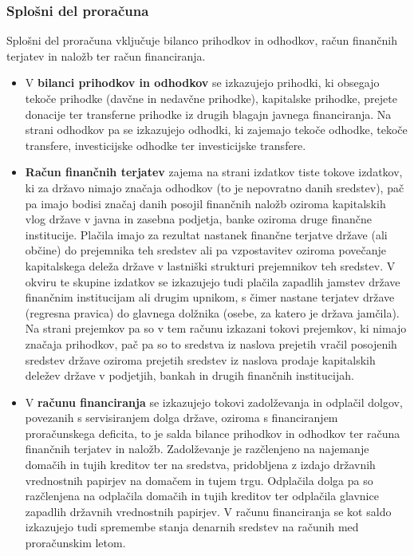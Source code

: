 \documentclass[12pt, a4paper]{article}
\begin{document}
\subsubsection[Splošno del proračuna]{Splošni del proračuna}
Splošni del proračuna vključuje bilanco prihodkov in odhodkov, račun finančnih terjatev in naložb ter račun financiranja.
\begin{itemize}
\item V \textbf{bilanci prihodkov in odhodkov} se izkazujejo prihodki, ki obsegajo tekoče prihodke (davčne in nedavčne prihodke), kapitalske prihodke, prejete donacije ter transferne prihodke iz drugih blagajn javnega financiranja. Na strani odhodkov pa se izkazujejo odhodki, ki zajemajo tekoče odhodke, tekoče transfere, investicijske odhodke ter investicijske transfere.

\item \textbf{Račun finančnih terjatev} zajema na strani izdatkov tiste tokove izdatkov, ki za državo nimajo značaja odhodkov (to je nepovratno danih sredstev), pač pa imajo bodisi značaj danih posojil finančnih naložb oziroma kapitalskih vlog države v javna in zasebna podjetja, banke oziroma druge finančne institucije. Plačila imajo za rezultat nastanek finančne terjatve države (ali občine) do prejemnika teh sredstev ali pa vzpostavitev oziroma povečanje kapitalskega deleža države v lastniški strukturi prejemnikov teh sredstev. V okviru te skupine izdatkov se izkazujejo tudi plačila zapadlih jamstev države finančnim institucijam ali drugim upnikom, s čimer nastane terjatev države (regresna pravica) do glavnega dolžnika (osebe, za katero je država jamčila). Na strani prejemkov pa so v tem računu izkazani tokovi prejemkov, ki nimajo značaja prihodkov, pač pa so to sredstva iz naslova prejetih vračil posojenih sredstev države oziroma prejetih sredstev iz naslova prodaje kapitalskih deležev države v podjetjih, bankah in drugih finančnih institucijah.

\item V \textbf{računu financiranja} se izkazujejo tokovi zadolževanja in odplačil dolgov, povezanih s servisiranjem dolga države, oziroma s financiranjem proračunskega deficita, to je salda bilance prihodkov in odhodkov ter računa finančnih terjatev in naložb. Zadolževanje je razčlenjeno na najemanje domačih in tujih kreditov ter na sredstva, pridobljena z izdajo državnih vrednostnih papirjev na domačem in tujem trgu. Odplačila dolga pa so razčlenjena na odplačila domačih in tujih kreditov ter odplačila glavnice zapadlih državnih vrednostnih papirjev. V računu financiranja se kot saldo izkazujejo tudi spremembe stanja denarnih sredstev na računih med proračunskim letom.
\end{itemize}
\end{document}
